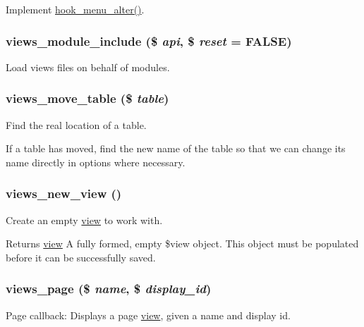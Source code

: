Implement \hyperlink{group__hooks_ga4c37deddcf48dbfe6f3081df1652f6fa}{hook\_\-menu\_\-alter()}. \hypertarget{views_8module_a22df4c2332b9999ad29f8e2771cf63b1}{
\subsubsection[{views\_\-module\_\-include}]{\setlength{\rightskip}{0pt plus 5cm}views\_\-module\_\-include (\$ {\em api}, \/  \$ {\em reset} = {\ttfamily FALSE})}}
\label{views_8module_a22df4c2332b9999ad29f8e2771cf63b1}
Load views files on behalf of modules. \hypertarget{views_8module_a06896a9ace9eb509293d9d915710562d}{
\subsubsection[{views\_\-move\_\-table}]{\setlength{\rightskip}{0pt plus 5cm}views\_\-move\_\-table (\$ {\em table})}}
\label{views_8module_a06896a9ace9eb509293d9d915710562d}
Find the real location of a table.

If a table has moved, find the new name of the table so that we can change its name directly in options where necessary. \hypertarget{views_8module_a6ebd20c8c63a43de53643809db0fd1f5}{
\subsubsection[{views\_\-new\_\-view}]{\setlength{\rightskip}{0pt plus 5cm}views\_\-new\_\-view ()}}
\label{views_8module_a6ebd20c8c63a43de53643809db0fd1f5}
Create an empty \hyperlink{classview}{view} to work with.

\begin{DoxyReturn}{Returns}
\hyperlink{classview}{view} A fully formed, empty \$view object. This object must be populated before it can be successfully saved. 
\end{DoxyReturn}
\hypertarget{views_8module_a1cbb11f8adc6fbfecb3a029ab2973cff}{
\subsubsection[{views\_\-page}]{\setlength{\rightskip}{0pt plus 5cm}views\_\-page (\$ {\em name}, \/  \$ {\em display\_\-id})}}
\label{views_8module_a1cbb11f8adc6fbfecb3a029ab2973cff}
Page callback: Displays a page \hyperlink{classview}{view}, given a name and display id.


